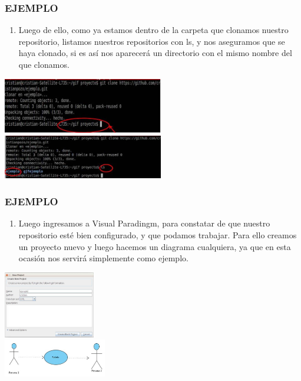 \documentclass[8pt]{beamer}
\begin{document}
\begin{frame}
\frametitle{EJEMPLO}
\begin{enumerate}[7. ]
	\justifying
    \item Luego de ello, como ya estamos dentro de la carpeta que clonamos nuestro repositorio, listamos nuestros repositorios con ls, y nos aseguramos que se haya clonado, si es así nos aparecerá un directorio con el mismo nombre del que clonamos.\\
\end{enumerate}
\begin{center}
\includegraphics[width=7cm]{img/b9}\\
\includegraphics[width=7cm]{img/b10}\\
\fontsize{6}{1}
\end{center}
\end{frame}

\begin{frame}
\frametitle{EJEMPLO}
\begin{enumerate}[8. ]
	\justifying
    \item Luego ingresamos a Visual Paradingm, para constatar de que nuestro repositorio esté bien configurado, y que podamos trabajar. Para ello creamos un proyecto nuevo y luego hacemos un diagrama cualquiera, ya que en esta ocasión nos servirá simplemente como ejemplo.\\
\end{enumerate}
\begin{center}
\includegraphics[width=4cm]{img/b11}\\
\includegraphics[width=4.5cm]{img/b12}\\
\fontsize{6}{1}
\end{center}
\end{frame}
\end{document}
